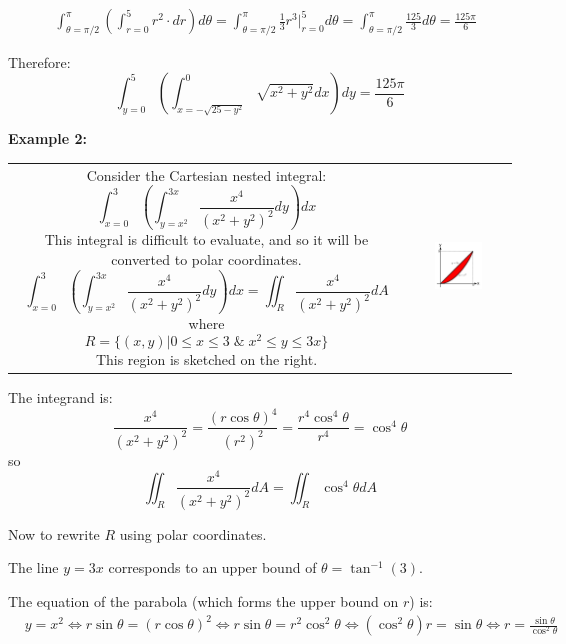 \documentclass{article}
\begin{document}
\begin{align*}
& \int_{\theta = \pi/2}^{\pi} \left(\int_{r = 0}^{5} r^2 \cdot dr\right)d\theta 
= \int_{\theta = \pi/2}^{\pi} \frac{1}{3}r^3\Big|_{r = 0}^{5} d\theta  
= \int_{\theta = \pi/2}^{\pi} \frac{125}{3} d\theta   
= \frac{125 \pi}{6}
\end{align*}

Therefore:
\[\int_{y = 0}^5 \left(\int_{x = -\sqrt{25 - y^2}}^{0} \sqrt{x^2 + y^2} dx\right)dy = \frac{125 \pi}{6}\]




\vspace{5mm}

\textbf{Example 2:}

\begin{tabular}{cc}
\parbox{0.5\textwidth}{
Consider the Cartesian nested integral:
\[\int_{x = 0}^3 \left(\int_{y = x^2}^{3x} \frac{x^4}{(x^2 + y^2)^2} dy\right)dx\] 
This integral is difficult to evaluate, and so it will be converted to polar coordinates. 
\[\int_{x = 0}^3 \left(\int_{y = x^2}^{3x} \frac{x^4}{(x^2 + y^2)^2} dy\right)dx = \iint_R \frac{x^4}{(x^2 + y^2)^2} dA\] 
where 
\[R = \{(x,y)| 0 \leq x \leq 3 \;\&\; x^2 \leq y \leq 3x\}\]
This region is sketched on the right.
} & \parbox{0.5\textwidth}{
\includegraphics[width = 0.5\textwidth]{Polar_region_3}
}
\end{tabular}

The integrand is:
\[\frac{x^4}{(x^2 + y^2)^2} 
= \frac{(r\cos\theta)^4}{(r^2)^2}
= \frac{r^4 \cos^4\theta}{r^4}
= \cos^4\theta\]
so
\[\iint_R \frac{x^4}{(x^2 + y^2)^2} dA = \iint_R \cos^4\theta dA\]

Now to rewrite \(R\) using polar coordinates. 

The line \(y = 3x\) corresponds to an upper bound of \(\theta = \tan^{-1}(3)\). 

The equation of the parabola (which forms the upper bound on \(r\)) is:
\begin{align*}
& y = x^2   
\iff r\sin\theta = (r\cos\theta)^2 
\iff r\sin\theta = r^2\cos^2\theta 
\iff (\cos^2\theta)r = \sin\theta 
\iff r = \frac{\sin\theta}{\cos^2\theta}
\end{align*}     
\end{document}
